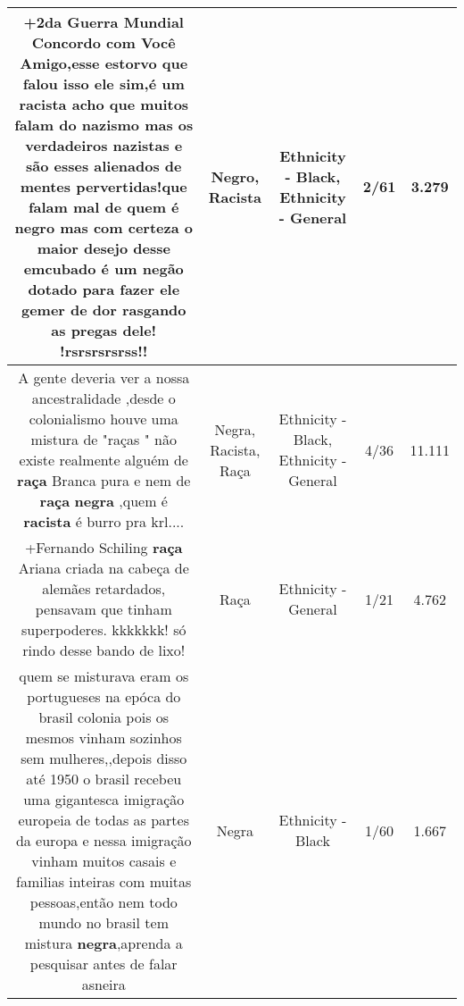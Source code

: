 \documentclass[11pt]{article}
\newlength\mylength
\begin{document}
\begin{center}
\begin{longtable}{|C{.65\mylength}|C{.30\mylength}|C{.12\mylength}|C{.12\mylength}|C{.12\mylength}|}
  \small +2da Guerra Mundial  Concordo com Você Amigo,esse estorvo que falou isso ele sim,é um \textbf{racista} acho que muitos falam do nazismo mas os verdadeiros nazistas e são esses alienados de mentes pervertidas!que falam mal de quem é \textbf{negro} mas com certeza o maior desejo desse emcubado é um negão dotado para fazer ele gemer de dor rasgando as pregas dele! !rsrsrsrsrss!!\normalsize   & Negro, Racista & Ethnicity - Black, Ethnicity - General & 2/61 & 3.279 \\  \hline
  \small A gente deveria ver a nossa ancestralidade ,desde o colonialismo houve uma mistura de "raças " não existe realmente alguém de \textbf{raça} Branca pura e nem de \textbf{raça} \textbf{negra} ,quem é \textbf{racista} é burro pra krl....\normalsize   & Negra, Racista, Raça & Ethnicity - Black, Ethnicity - General & 4/36 & 11.111 \\  \hline
  \small +Fernando Schiling \textbf{raça} Ariana criada na cabeça de alemães retardados, pensavam que tinham superpoderes. kkkkkkk! só rindo desse bando de lixo!\normalsize   & Raça & Ethnicity - General & 1/21 & 4.762 \\  \hline
  \small quem se misturava eram os portugueses na epóca do brasil colonia pois os mesmos vinham sozinhos sem mulheres,,depois disso até 1950 o brasil recebeu uma gigantesca imigração europeia de todas as partes da europa e nessa imigração vinham muitos casais e familias inteiras com muitas pessoas,então nem todo mundo no brasil tem mistura \textbf{negra},aprenda a pesquisar antes de falar asneira\normalsize   & Negra & Ethnicity - Black & 1/60 & 1.667 \\  \hline

\end{longtable}
\end{center}
\end{document}
